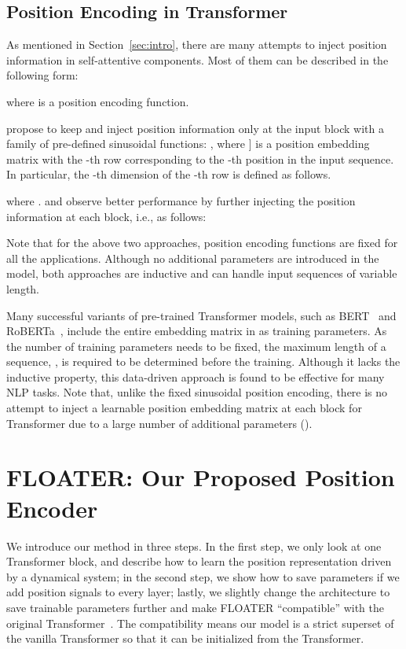 \documentclass[11pt]{article}
\begin{document}
\subsection{Position Encoding in Transformer}
\label{sec:pos-enc-formulation}
As mentioned in Section~\ref{sec:intro}, there are many attempts to inject position information in self-attentive components. Most of them can be described in the following form:

where  is a position encoding function.  

\cite{vaswani2017attention} propose to keep  and inject position information only at the input block with a family of pre-defined sinusoidal functions: , where ] is a position embedding matrix with the -th row corresponding to the -th position in the input sequence. In particular, the -th dimension of the -th row is defined as follows. 
 
where .
\cite{dehghani2018universal} and \cite{lan2019albert} observe better performance by further injecting the position information at each block, i.e.,  as follows:

Note that for the above two approaches, position encoding functions  are fixed for all the applications. Although no additional parameters are introduced in the model, both approaches are inductive and can handle input sequences of variable length. 

Many successful variants of pre-trained Transformer models, such as BERT~\cite{devlin2018bert} and RoBERTa~\cite{liu2019roberta}, include the entire embedding matrix  in  as training parameters. As the number of training parameters needs to be fixed, the maximum length of a sequence, , is required to be determined before the training. Although it lacks the inductive property, this data-driven approach is found to be effective for many NLP tasks. Note that, unlike the fixed sinusoidal position encoding, there is no attempt to inject a learnable position embedding matrix at each block for Transformer due to a large number of additional parameters (). 

\section{FLOATER: Our Proposed Position Encoder}
\label{sec:flower}
We introduce our method in three steps. In the first step, we only look at one Transformer block, and describe how to learn the position representation driven by a dynamical system; in the second step, we show how to save parameters if we add position signals to every layer; lastly, we slightly change the architecture to save trainable parameters further and make FLOATER ``compatible'' with the original Transformer~\cite{vaswani2017attention}. The compatibility means our model is a strict superset of the vanilla Transformer so that it can be initialized from the Transformer. 
\end{document}
